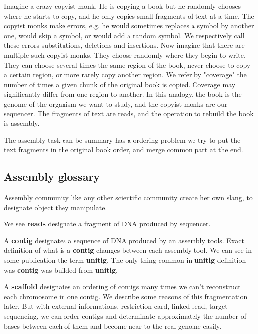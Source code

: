 \documentclass[./main.tex]{subfiles}
\begin{document}
Imagine a crazy copyist monk. He is copying a book but he randomly chooses where he starts to copy, and he only copies small fragments of text at a time.
The copyist monks make errors, e.g. he would sometimes replaces a symbol by another one, would skip a symbol, or would add a random symbol. We respectively call these errors substitutions, deletions and insertions.
Now imagine that there are multiple such copyist monks.
They choose randomly where they begin to write. They can choose several times the same region of the book, never choose to copy a certain region, or more rarely copy another region. We refer by "coverage" the number of times a given chunk of the original book is copied. Coverage may significantly differ from one region to another.
In this analogy, the book is the genome of the organism we want to study, and the copyist monks are our sequencer. The fragments of text are reads, and the operation to rebuild the book is assembly.

The assembly task can be summary has a ordering problem we try to put the text fragments in the original book order, and merge common part at the end.

\subsection{Assembly glossary} 

Assembly community like any other scientific community create her own slang, to designate object they manipulate.

We see \textbf{reads} designate a fragment of DNA produced by sequencer.

A \textbf{contig} designates a sequence of DNA produced by an assembly tools. Exact definition of what is a \textbf{contig} changes between each assembly tool. We can see in some publication the term \textbf{unitig}. The only thing common in \textbf{unitig} definition was \textbf{contig} was builded from \textbf{unitig}.

A \textbf{scaffold} designates an ordering of contigs many times we can't reconstruct each chromosome in one contig. We describe some reasons of this fragmentation later. But with external informations, restriction card, linked read, target sequencing, we can order contigs and determinate approximately the number of bases between each of them and become near to the real genome easily.
\end{document}
